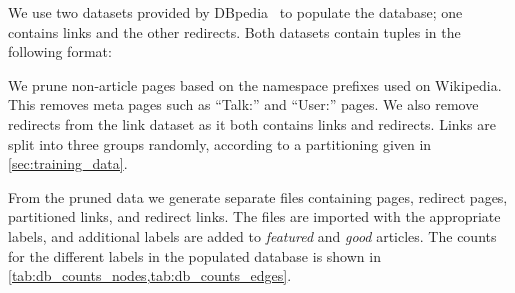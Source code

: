 We use two datasets provided by DBpedia~\cite{dbpedia} to populate the database; one contains links and the other redirects. Both datasets contain tuples in the following format: 


\begin{center}
\end{center}

We prune non-article pages based on the namespace prefixes used on Wikipedia. This removes meta pages such as \enquote{Talk:} and \enquote{User:} pages. We also remove redirects from the link dataset as it both contains links and redirects. Links are split into three groups randomly, according to a partitioning given in \cref{sec:training_data}. 

From the pruned data we generate separate files containing pages, redirect pages, partitioned links, and redirect links. The files are imported with the appropriate labels, and additional labels are added to \emph{featured} and \emph{good} articles.
 The counts for the different labels in the populated database is shown in \cref{tab:db_counts_nodes,tab:db_counts_edges}.

